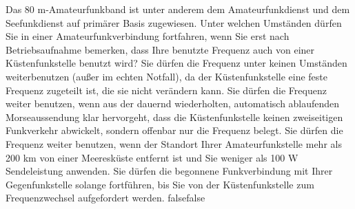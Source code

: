     {Das 80 m-Amateurfunkband ist unter anderem dem Amateurfunkdienst und dem Seefunkdienst auf primärer Basis zugewiesen. Unter welchen Umständen dürfen Sie in einer Amateurfunkverbindung fortfahren, wenn Sie erst nach Betriebsaufnahme bemerken, dass Ihre benutzte Frequenz auch von einer Küstenfunkstelle benutzt wird?}
    {Sie dürfen die Frequenz unter keinen Umständen weiterbenutzen (außer im echten Notfall), da der Küstenfunkstelle eine feste Frequenz zugeteilt ist, die sie nicht verändern kann.}
    {Sie dürfen die Frequenz weiter benutzen, wenn aus der dauernd wiederholten, automatisch ablaufenden Morseaussendung klar hervorgeht, dass die Küstenfunkstelle keinen zweiseitigen Funkverkehr abwickelt, sondern offenbar nur die Frequenz belegt.}
    {Sie dürfen die Frequenz weiter benutzen, wenn der Standort Ihrer Amateurfunkstelle mehr als 200 km von einer Meeresküste entfernt ist und Sie weniger als 100 W Sendeleistung anwenden.}
    {Sie dürfen die begonnene Funkverbindung mit Ihrer Gegenfunkstelle solange fortführen, bis Sie von der Küstenfunkstelle zum Frequenzwechsel aufgefordert werden.}
    {false}{false}